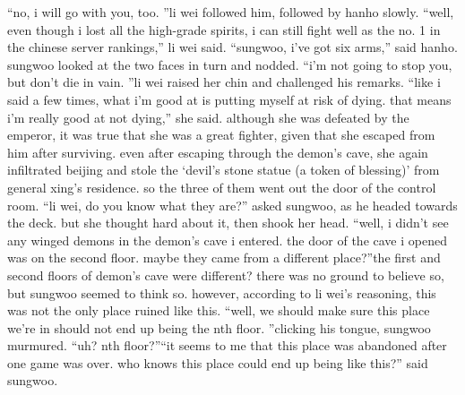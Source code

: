 “no, i will go with you, too.
”li wei followed him, followed by hanho slowly.
“well, even though i lost all the high-grade spirits, i can still fight well as the no.
1 in the chinese server rankings,” li wei said.
“sungwoo, i’ve got six arms,” said hanho.
sungwoo looked at the two faces in turn and nodded.
“i’m not going to stop you, but don’t die in vain.
”li wei raised her chin and challenged his remarks.
“like i said a few times, what i’m good at is putting myself at risk of dying.
 that means i’m really good at not dying,” she said.
although she was defeated by the emperor, it was true that she was a great fighter, given that she escaped from him after surviving.
 even after escaping through the demon’s cave, she again infiltrated beijing and stole the ‘devil’s stone statue (a token of blessing)’ from general xing’s residence.
so the three of them went out the door of the control room.
“li wei, do you know what they are?” asked sungwoo, as he headed towards the deck.
but she thought hard about it, then shook her head.
“well, i didn’t see any winged demons in the demon’s cave i entered.
 the door of the cave i opened was on the second floor.
 maybe they came from a different place?”the first and second floors of demon’s cave were different? there was no ground to believe so, but sungwoo seemed to think so.
 however, according to li wei’s reasoning, this was not the only place ruined like this.
“well, we should make sure this place we’re in should not end up being the nth floor.
”clicking his tongue, sungwoo murmured.
“uh? nth floor?”“it seems to me that this place was abandoned after one game was over.
 who knows this place could end up being like this?” said sungwoo.

